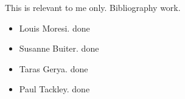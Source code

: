 
This is relevant to me only. Bibliography work.
\begin{itemize}
\item Louis Moresi. done
\item Susanne Buiter. done
\item Taras Gerya. done
\item Paul Tackley. done
\end{itemize}
